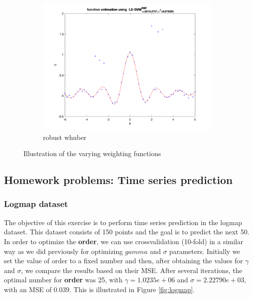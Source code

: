\documentclass[a4paper, 11pt, one column]{article}
\begin{document}
\begin{figure}[h]
\begin{subfigure}{0.45\linewidth}
            \includegraphics[width=\linewidth]{images/robust_whuber.png}
            \caption{robust whuber}
        \end{subfigure}\hfil
    \caption{Illustration of the varying weighting functions}
    \label{fig:robustothers}
\end{figure}

\subsection{Homework problems: Time series prediction}
\subsubsection{Logmap dataset}
The objective of this exercise is to perform time series prediction in the logmap dataset. This dataset consists of 150 points and the goal is to predict the next 50. In order to optimize the \textbf{order}, we can use crossvalidation (10-fold) in a similar way as we did previously for optimizing $gamma$ and $\sigma$ parameters. Initially we set the value of order to a fixed number and then, after obtaining the values for $\gamma$ and $\sigma$, we compare the results based on their MSE. After several iterations, the optimal number for \textbf{order} was 25, with $\gamma = 1.0235e+06$ and $\sigma=2.22790e+03$, with an MSE of $0.039$. This is illustrated in Figure \ref{fig:logmap}.
\end{document}

